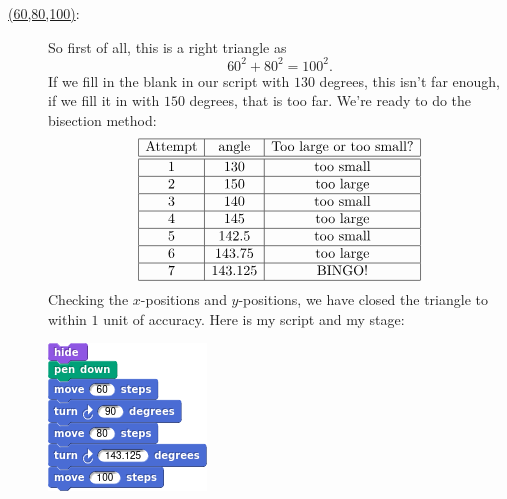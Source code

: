 \documentclass[noauthor,nooutcomes,handout]{ximera}
\begin{document}
\begin{question}
\begin{freeResponse}
\begin{description}
      \item[\underline{(60,80,100)}:] So first of all, this is a right
        triangle as
        \[
        60^2 + 80^2 = 100^2.
        \]
        If we fill in the blank in our script with $130$ degrees, this
        isn't far enough, if we fill it in with $150$ degrees, that is
        too far. We're ready to do the bisection method:
        \[
        \begin{array}{|c|c|c|c|}\hline
          \text{Attempt} & \text{angle} & \text{Too large or too small?} \\ \hline\hline
          1 & 130 & \text{too small} \\ \hline
          2 & 150 & \text{too large}  \\ \hline
          3 & 140 & \text{too small}  \\ \hline
          4 & 145 & \text{too large}  \\ \hline
          5 & 142.5 & \text{too small}  \\ \hline
          6 & 143.75 & \text{too large}  \\ \hline
          7 & 143.125 & \text{BINGO!}  \\ \hline
        \end{array}
        \]
        Checking the $x$-positions and $y$-positions, we have closed
        the triangle to within $1$ unit of accuracy. Here is my script and my stage:
        \begin{center}
          \includegraphics[width=.3\textwidth]{6080100-script.png}   \qquad {}
        \end{center}
    \end{description}
  \end{freeResponse}
\end{question}
\mynewpage
\end{document}
